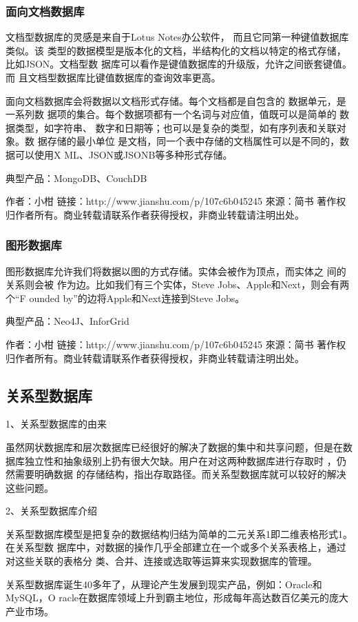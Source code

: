 \subsubsection*{面向文档数据库}
文档型数据库的灵感是来自于Lotus Notes办公软件，
而且它同第一种键值数据库类似。该
类型的数据模型是版本化的文档，半结构化的文档以特定的格式存储，比如JSON。文档型数
据库可以看作是键值数据库的升级版，允许之间嵌套键值。而
且文档型数据库比键值数据库的查询效率更高。

面向文档数据库会将数据以文档形式存储。每个文档都是自包含的
数据单元，是一系列数
据项的集合。每个数据项都有一个名词与对应值，值既可以是简单的
数据类型，如字符串、
数字和日期等；也可以是复杂的类型，如有序列表和关联对象。数
据存储的最小单位
是文档，同一个表中存储的文档属性可以是不同的，数据可以使用X
ML、JSON或JSONB等多种形式存储。

典型产品：MongoDB、CouchDB

作者：小柑
链接：http://www.jianshu.com/p/107c6b045245
來源：简书
著作权归作者所有。商业转载请联系作者获得授权，非商业转载请注明出处。
\subsubsection*{图形数据库}
图形数据库允许我们将数据以图的方式存储。实体会被作为顶点，而实体之
间的关系则会被
作为边。比如我们有三个实体，Steve Jobs、Apple和Next，则会有两个“F
ounded by”的边将Apple和Next连接到Steve Jobs。

典型产品：Neo4J、InforGrid

作者：小柑
链接：http://www.jianshu.com/p/107c6b045245
來源：简书
著作权归作者所有。商业转载请联系作者获得授权，非商业转载请注明出处。
\subsection*{关系型数据库}
1、关系型数据库的由来

虽然网状数据库和层次数据库已经很好的解决了数据的集中和共享问题，但是在数
据库独立性和抽象级别上扔有很大欠缺。用户在对这两种数据库进行存取时
，仍然需要明确数据
的存储结构，指出存取路径。而关系型数据库就可以较好的解决这些问题。

2、关系型数据库介绍

关系型数据库模型是把复杂的数据结构归结为简单的二元关系1即二维表格形式1。
在关系型数
据库中，对数据的操作几乎全部建立在一个或多个关系表格上，通过对这些关联的表格分
类、合并、连接或选取等运算来实现数据库的管理。

关系型数据库诞生40多年了，从理论产生发展到现实产品，例如：Oracle和MySQL，O
racle在数据库领域上升到霸主地位，形成每年高达数百亿美元的庞大产业市场。

